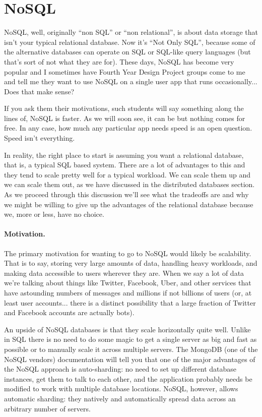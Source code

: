 




\section*{NoSQL}

NoSQL, well, originally ``non SQL'' or ``non relational'', is about data storage that isn't your typical relational database. Now it's ``Not Only SQL'', because some of the alternative databases can operate on SQL or SQL-like query languages (but that's sort of not what they are for). These days, NoSQL has become very popular and I sometimes have Fourth Year Design Project groups come to me and tell me they want to use NoSQL on a single user app that runs occasionally... Does that make sense?

If you ask them their motivations, such students will say something along the lines of, NoSQL is faster. As we will soon see, it can be but nothing comes for free. In any case, how much any particular app needs speed is an open question. Speed isn't everything. 

In reality, the right place to start is assuming you want a relational database, that is, a typical SQL based system. There are a lot of advantages to this and they tend to scale pretty well for a typical workload. We can scale them up and we can scale them out, as we have discussed in the distributed databases section. As we proceed through this discussion we'll see what the tradeoffs are and why we might be willing to give up the advantages of the relational database because we, more or less, have no choice.

\paragraph{Motivation.} The primary motivation for wanting to go to NoSQL would likely be scalability. That is to say, storing very large amounts of data, handling heavy workloads, and making data accessible to users wherever they are. When we say a lot of data we're talking about things like Twitter, Facebook, Uber, and other services that have astounding numbers of messages and millions if not billions of users (or, at least user accounts... there is a distinct possibility that a large fraction of Twitter and Facebook accounts are actually bots). 

An upside of NoSQL databases is that they scale horizontally quite well. Unlike in SQL there is no need to do some magic to get a single server as big and fast as possible or to manually scale it across multiple servers. The MongoDB (one of the NoSQL vendors) documentation will tell you that one of the major advantages of the NoSQL approach is auto-sharding: no need to set up different database instances, get them to talk to each other, and the application probably needs be modified to work with multiple database locations. NoSQL, however, allows automatic sharding: they natively and automatically spread data across an arbitrary number of servers.  


